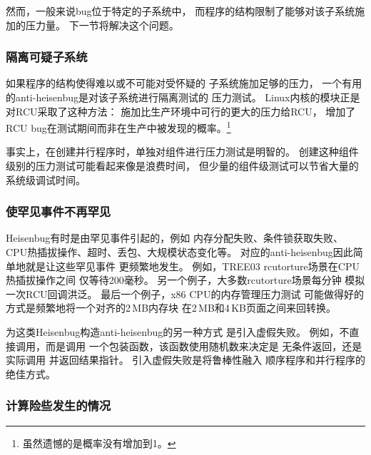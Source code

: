 然而，一般来说bug位于特定的子系统中，
而程序的结构限制了能够对该子系统施加的压力量。
下一节将解决这个问题。

\subsubsection{隔离可疑子系统}
\label{sec:debugging:Isolate Suspicious Subsystems}

如果程序的结构使得难以或不可能对受怀疑的
子系统施加足够的压力，
一个有用的anti-heisenbug是对该子系统进行隔离测试的
压力测试。
Linux内核的模块正是对RCU采取了这种方法：
施加比生产环境中可行的更大的压力给RCU，
增加了RCU bug在测试期间而非在生产中被发现的概率。\footnote{
	虽然遗憾的是概率没有增加到1。}

事实上，在创建并行程序时，单独对组件进行压力测试是明智的。
创建这种组件级别的压力测试可能看起来像是浪费时间，
但少量的组件级测试可以节省大量的系统级调试时间。

\subsubsection{使罕见事件不再罕见}
\label{sec:debugging:Make Rare Events Less Rare}

Heisenbug有时是由罕见事件引起的，例如
内存分配失败、条件锁获取失败、
CPU热插拔操作、超时、丢包、大规模状态变化等。
对应的anti-heisenbug因此简单地就是让这些罕见事件
更频繁地发生。
例如，TREE03 rcutorture场景在CPU热插拔操作之间
仅等待200毫秒。
另一个例子，大多数rcutorture场景每分钟
模拟一次RCU回调洪泛。
最后一个例子，x86 CPU的内存管理压力测试
可能做得好的方式是频繁地将一个对齐的2\,MB内存块
在2\,MB和4\,KB页面之间来回转换。

为这类Heisenbug构造anti-heisenbug的另一种方式
是引入虚假失败。
例如，不直接调用，而是调用
一个包装函数，该函数使用随机数来决定是
无条件返回，还是实际调用
并返回结果指针。
引入虚假失败是将鲁棒性融入
顺序程序和并行程序的绝佳方式。

\QuickQuizEnd

\subsubsection{计算险些发生的情况}
\label{sec:debugging:Count Near Misses}

